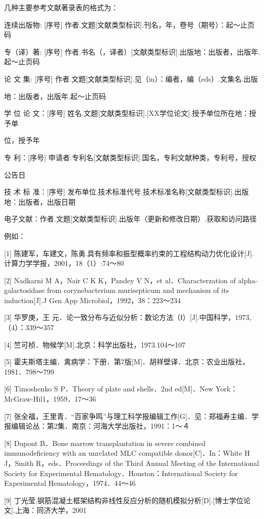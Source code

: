 几种主要参考文献著录表的格式为：

连续出版物: [序号] 作者.文题[文献类型标识].刊名，年，卷号（期号）：起～止页码

专（译）著:  [序号] 作者.书名（，译者）[文献类型标识].出版地：出版者，出版年.起～止页码

论 文 集: [序号] 作者.文题[文献类型标识].见（in）：编者，编（eds）.文集名.出版

地：出版者，出版年.起～止页码

学 位 论 文：[序号] 姓名.文题[文献类型标识].[XX学位论文].授予单位所在地：授予单

位，授予年

专      利：[序号] 申请者.专利名[文献类型标识].国名，专利文献种类，专利号，授权

公告日

技 术 标 准：[序号] 发布单位.技术标准代号.技术标准名称[文献类型标识].出版地：出版者，出版日期

电子文献：作者.文题[文献类型标识].出版年（更新和修改日期）.获取和访问路径

例如：

[1] 陈建军，车建文，陈勇.具有频率和振型概率约束的工程结构动力优化设计[J].计算力学学报，2001，18（1）:74～80

[2] Nadkarni M A，Nair C K K，Pandey V N，et al．Characterzation of alpha-galactosidase from corynebacterium murisepticum and mechanism of its induction[J].J Gen App Microbiol，1992，38：223～234 

[3] 华罗庚，王 元．论一致分布与近似分析：数论方法（Ⅰ）[J].中国科学，1973,（4）：339～357 

[4] 竺可桢．物候学[M].北京：科学出版社，1973.104～107

[5] 霍夫斯塔主编．禽病学：下册．第7版[M]．胡祥壁译．北京：农业出版社，1981．798～799 

[6] Timoshenko S P．Theory of plate and shells．2nd ed[M]．New York：McGraw-Hil1，1959．17～36

[7] 张全福，王里青．“百家争鸣”与理工科学报编辑工作[G]．见：郑福寿主编．学报编辑论丛：第2集．南京：河海大学出版社，1991：1～４ 

[8] Dupont B．Bone marrow transplantation in severe combined immunodeficiency with an unrclated MLC compatible donor[C]．In：White H J，Smith R，eds．Proceedings of the Third Annual Meeting of the International Society for Experimental Hematology．Houston：International Society for Experimental Hematology，1974．44～46 

[9] 丁光莹.钢筋混凝土框架结构非线性反应分析的随机模拟分析[D].[博士学位论文].上海：同济大学，2001 


